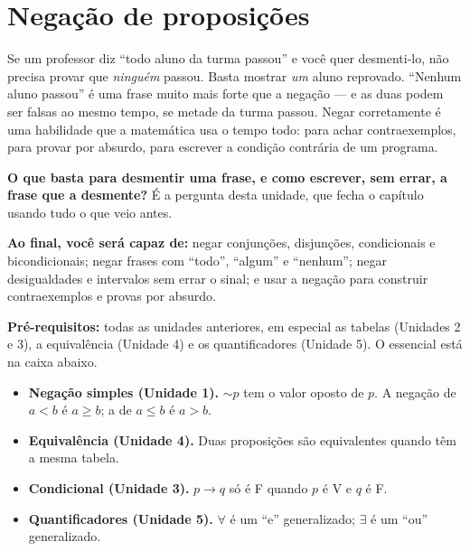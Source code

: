 \providecommand{\nao}{{\sim}}
\clearpage
\section{Negação de proposições}

\Prefacio
\begin{prefacio}

Se um professor diz \enquote{todo aluno da turma passou} e você quer desmenti-lo, não precisa provar que \emph{ninguém} passou. Basta mostrar \emph{um} aluno reprovado. \enquote{Nenhum aluno passou} é uma frase muito mais forte que a negação — e as duas podem ser falsas ao mesmo tempo, se metade da turma passou. Negar corretamente é uma habilidade que a matemática usa o tempo todo: para achar contraexemplos, para provar por absurdo, para escrever a condição contrária de um programa.

\textbf{O que basta para desmentir uma frase, e como escrever, sem errar, a frase que a desmente?} É a pergunta desta unidade, que fecha o capítulo usando tudo o que veio antes.

\textbf{Ao final, você será capaz de:} negar conjunções, disjunções, condicionais e bicondicionais; negar frases com \enquote{todo}, \enquote{algum} e \enquote{nenhum}; negar desigualdades e intervalos sem errar o sinal; e usar a negação para construir contraexemplos e provas por absurdo.

\textbf{Pré-requisitos:} todas as unidades anteriores, em especial as tabelas (Unidades 2 e 3), a equivalência (Unidade 4) e os quantificadores (Unidade 5). O essencial está na caixa abaixo.
\end{prefacio}

\begin{minimo}
\begin{itemize}[leftmargin=1.2em]
  \item \textbf{Negação simples (Unidade 1).} ${\nao}p$ tem o valor oposto de $p$. A negação de $a<b$ é $a\ge b$; a de $a\le b$ é $a>b$.
  \item \textbf{Equivalência (Unidade 4).} Duas proposições são equivalentes quando têm a mesma tabela.
  \item \textbf{Condicional (Unidade 3).} $p\rightarrow q$ só é F quando $p$ é V e $q$ é F.
  \item \textbf{Quantificadores (Unidade 5).} $\forall$ é um \enquote{e} generalizado; $\exists$ é um \enquote{ou} generalizado.
\end{itemize}
\end{minimo}

